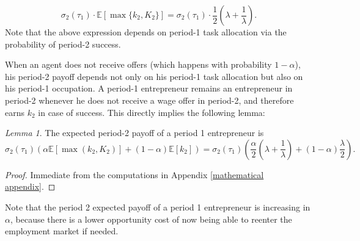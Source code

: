 \documentclass[12pt,american]{paper}
\theoremstyle{remark}
\newtheorem{lemma}{Lemma}
\begin{document}
\[
\sigma_2(\tau_1) \cdot \mathbb E[\max\{k_2,K_2\}]=\sigma_2(\tau_1) \cdot \frac{1}{2} \left( \lambda + \frac{1}{\lambda} \right).
\]
Note that the above expression depends on period-1 task allocation via the probability of period-2 success.


When an agent does not receive offers (which happens with probability $1-\alpha$), his period-2 payoff depends not only on his period-1 task allocation but also on his period-1 occupation. A period-1 entrepreneur remains an entrepreneur in period-2 whenever he does not receive a wage offer in period-2, and therefore earns $k_2$ in case of success. This directly implies the following lemma:

\begin{lemma}
The expected period-2 payoff of a period 1 entrepreneur is
\[
\sigma_2(\tau_1)\left(\alpha \mathbb E[\max(k_2,K_2)]+(1-\alpha)\mathbb E[k_2] \right)
=\sigma_2(\tau_1) \left(  \frac{\alpha}{2} \left( \lambda + \frac{1}{\lambda} \right) + (1-\alpha) \frac{\lambda}{2} \right).
\]
\end{lemma}
\begin{proof}
Immediate from the computations in Appendix \ref{mathematical appendix}.
\end{proof}
Note that the period 2 expected payoff of a period 1 entrepreneur is increasing in $\alpha$, because there is a lower opportunity cost of now being able to reenter the employment market if needed.
\end{document}
